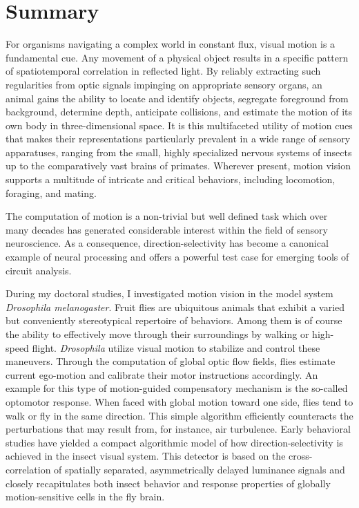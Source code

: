
\chapter*{Summary}
\label{chp:summary}

For organisms navigating a complex world in constant flux, visual motion is a fundamental cue. Any movement of a physical object results in a specific pattern of spatiotemporal correlation in reflected light.
By reliably extracting such regularities from optic signals impinging on appropriate sensory organs, an animal gains the ability to locate and identify objects, segregate foreground from background, determine depth, anticipate collisions, and estimate the motion of its own body in three-dimensional space. It is this multifaceted utility of motion cues that makes their representations particularly prevalent in a wide range of sensory apparatuses, ranging from the small, highly specialized nervous systems of insects up to the comparatively vast brains of primates. Wherever present, motion vision supports a multitude of intricate and critical behaviors, including locomotion, foraging, and mating.

The computation of motion is a non-trivial but well defined task which over many decades has generated considerable interest within the field of sensory neuroscience. As a consequence, direction-selectivity has become a canonical example of neural processing and offers a powerful test case for emerging tools of circuit analysis.

During my doctoral studies, I investigated motion vision in the model system \textit{Drosophila melanogaster}. Fruit flies are ubiquitous animals that exhibit a varied but conveniently stereotypical repertoire of behaviors. Among them is of course the ability to effectively move through their surroundings by walking or high-speed flight. \textit{Drosophila} utilize visual motion to stabilize and control these maneuvers. Through the computation of global optic flow fields, flies estimate current ego-motion and calibrate their motor instructions accordingly. An example for this type of motion-guided compensatory mechanism is the so-called optomotor response. When faced with global motion toward one side, flies tend to walk or fly in the same direction. This simple algorithm efficiently counteracts the perturbations that may result from, for instance, air turbulence. Early behavioral studies have yielded a compact algorithmic model of how direction-selectivity is achieved in the insect visual system. This detector is based on the cross-correlation of spatially separated, asymmetrically delayed luminance signals and closely recapitulates both insect behavior and response properties of globally motion-sensitive cells in the fly brain.

